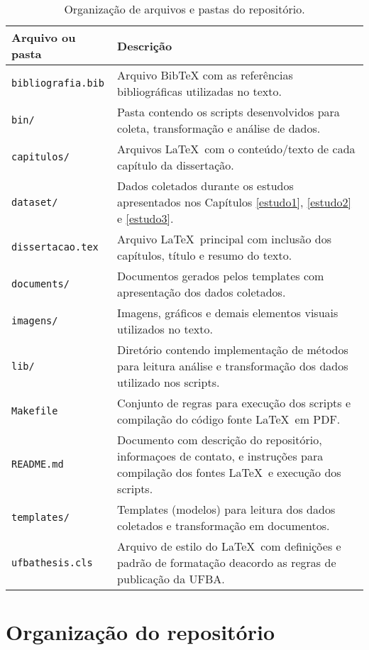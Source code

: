 \begin{table}[h]
\caption{Organização de arquivos e pastas do repositório.}
\centering
\begin{tabular}{ l p{10cm} }
  \hline
  Arquivo ou pasta            & Descrição           \\
  \hline
  \texttt{bibliografia.bib}   & Arquivo BibTeX com as referências bibliográficas utilizadas no texto. \\
  \texttt{bin/}               & Pasta contendo os scripts desenvolvidos para coleta, transformação e análise de dados. \\
  \texttt{capitulos/}         & Arquivos \LaTeX \ com o conteúdo/texto de cada capítulo da dissertação. \\
  \texttt{dataset/}           & Dados coletados durante os estudos apresentados nos Capítulos \ref{estudo1}, \ref{estudo2} e \ref{estudo3}. \\
  \texttt{dissertacao.tex}    & Arquivo \LaTeX \ principal com inclusão dos capítulos, título e resumo do texto. \\
  \texttt{documents/}         & Documentos gerados pelos templates com apresentação dos dados coletados. \\
  \texttt{imagens/}           & Imagens, gráficos e demais elementos visuais utilizados no texto. \\
  \texttt{lib/}               & Diretório contendo implementação de métodos para leitura análise e transformação dos dados utilizado nos scripts. \\
  \texttt{Makefile}           & Conjunto de regras para execução dos scripts e compilação do código fonte \LaTeX \ em PDF.                 \\
  \texttt{README.md}          & Documento com descrição do repositório, informaçoes de contato, e instruções para compilação dos fontes \LaTeX \ e execução dos scripts. \\
  \texttt{templates/}         & Templates (modelos) para leitura dos dados coletados e transformação em documentos. \\
  \texttt{ufbathesis.cls}     & Arquivo de estilo do \LaTeX \ com definições e padrão de formatação deacordo as regras de publicação da UFBA. \\
  \hline
\end{tabular}
\label{arquivos-repositorio}
\end{table}

\section{Organização do repositório}

